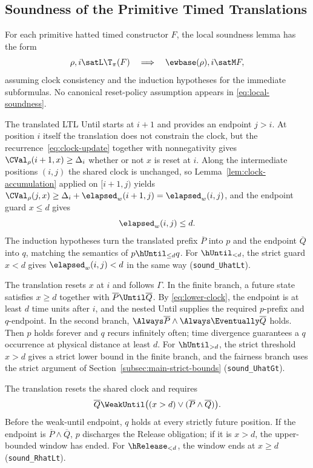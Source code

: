 \subsection{Soundness of the Primitive Timed Translations}
\label{subsec:timed-soundness}

For each primitive hatted timed constructor $F$, the local soundness lemma has
the form
\begin{equation}
  \rho,i\satL \T_\pi(F)
  \quad\Longrightarrow\quad
  \ewbase(\rho),i\satM F,
\label{eq:local-soundness}
\end{equation}
assuming clock consistency and the induction hypotheses for the immediate
subformulas.  No canonical reset-policy assumption appears in
\eqref{eq:local-soundness}.

The translated LTL Until starts at $i+1$ and provides an endpoint $j>i$.
At position $i$ itself the translation does not constrain the clock, but the
recurrence~\eqref{eq:clock-update} together with nonnegativity gives
$\CVal_\rho(i+1,x)\ge\Delta_i$ whether or not $x$ is reset at $i$.  Along the
intermediate positions $(i,j)$ the shared clock is unchanged, so
Lemma~\ref{lem:clock-accumulation} applied on $[i+1,j)$ yields
$\CVal_\rho(j,x)\ge\Delta_i+\elapsed_w(i+1,j)=\elapsed_w(i,j)$, and the
endpoint guard $x\le d$ gives
\[
  \elapsed_w(i,j)\le d.
\]
The induction hypotheses turn the translated prefix $\overline{P}$ into $p$ and the
endpoint $\overline{Q}$ into $q$, matching the semantics of
$p\hUntil_{\le d}q$.  For $\hUntil_{<d}$, the strict guard $x<d$ gives
$\elapsed_w(i,j)<d$ in the same way (\texttt{sound\_\allowbreak{}UhatLt}).

The translation resets $x$ at $i$ and follows $\Gamma$.  In the finite branch,
a future state satisfies $x\ge d$ together with $\overline{P}\Until \overline{Q}$.  By
\eqref{eq:lower-clock}, the endpoint is at least $d$ time units after $i$, and
the nested Until supplies the required $p$-prefix and $q$-endpoint.  In the
second branch, $\Always \overline{P}\land\Always\Eventually \overline{Q}$ holds.  Then $p$ holds
forever and $q$ recurs infinitely often; time divergence guarantees a $q$
occurrence at physical distance at least $d$.  For $\hUntil_{>d}$, the strict
threshold $x>d$ gives a strict lower bound in the finite branch, and the
fairness branch uses the strict argument of Section~\ref{subsec:main-strict-bounds}
(\texttt{sound\_\allowbreak{}UhatGt}).

The translation resets the shared clock and requires
\[
  \overline{Q}\WeakUntil\bigl((x>d)\lor(\overline{P}\land \overline{Q})\bigr).
\]
Before the weak-until endpoint, $q$ holds at every strictly future position.
If the endpoint is $\overline{P}\land \overline{Q}$, $p$ discharges the Release obligation; if it is
$x>d$, the upper-bounded window has ended.  For $\hRelease_{<d}$, the window
ends at $x\ge d$ (\texttt{sound\_\allowbreak{}RhatLt}).

